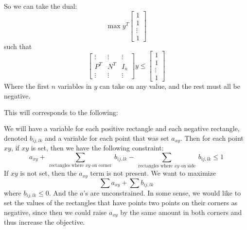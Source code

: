 \documentclass[11pt]{article}
\begin{document}
So we can take the dual:
\[ \max y^T \left[ \begin{array}{c} 1 \\ 1 \\ \vdots \\ 1 \end{array} \right] \]
such that
\[ \left[ \begin{array}{ccc} \vdots & \vdots & \vdots \\
					  P^T & N^T & I_n \\
					\vdots & \vdots & \vdots \end{array} \right] y
\leq  \left[ \begin{array}{c} 1 \\ 1 \\ \vdots \\ 1 \end{array} \right] \]
Where the first $n$ variables in $y$ can take on any value, and the rest must all be negative. 

This will corresponds to the following:

We will have a variable for each positive rectangle and each negative rectangle, denoted $b_{ij, lk}$ and a variable for each point that was set $a_{xy}$. Then for each point $xy$, if $xy$ is set, then we have the following constraint:
\[ a_{xy} + \sum_{\text{ rectangles where $xy$ on corner }} b_{ij, lk} - \sum_{\text{ rectangles where $xy$ on side }} b_{ij,lk} \leq 1 \]
If $xy$ is not set, then the $a_{xy}$ term is not present. We want to maximize
\[ \sum a_{xy} + \sum b_{ij,lk} \]
where $b_{ij,lk} \leq 0$. And the $a$'s are unconstrained. In some sense, we would like to set the values of the rectangles that have points two points on their corners as negative, since then we could raise $a_{xy}$ by the same amount in both corners and thus increase the objective.
\end{document}
